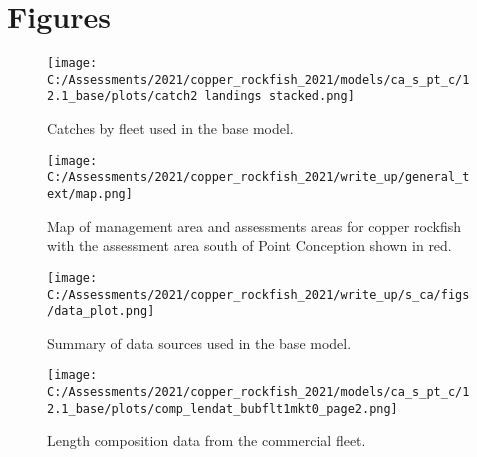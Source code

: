\documentclass[11pt,
  english,
  a4paper,
]{article}
\begin{document}
\newpage

\clearpage


\hypertarget{figures}{%
\section{Figures}\label{figures}}

\leavevmode\tagmcend\tagstructend


\begin{figure}
\centering
\texttt{[image: C:/Assessments/2021/copper\_rockfish\_2021/models/ca\_s\_pt\_c/12.1\_base/plots/catch2 landings stacked.png]}
\caption{Catches by fleet used in the base model.\label{fig:catch}}
\end{figure}

\tagmcend\tagstructend


\begin{figure}
\centering
\texttt{[image: C:/Assessments/2021/copper\_rockfish\_2021/write\_up/general\_text/map.png]}
\caption{Map of management area and assessments areas for copper rockfish with the assessment area south of Point Conception shown in red.\label{fig:map}}
\end{figure}

\tagmcend\tagstructend


\begin{figure}
\centering
\texttt{[image: C:/Assessments/2021/copper\_rockfish\_2021/write\_up/s\_ca/figs/data\_plot.png]}
\caption{Summary of data sources used in the base model.\label{fig:data-plot}}
\end{figure}

\tagmcend\tagstructend


\begin{figure}
\centering
\texttt{[image: C:/Assessments/2021/copper\_rockfish\_2021/models/ca\_s\_pt\_c/12.1\_base/plots/comp\_lendat\_bubflt1mkt0\_page2.png]}
\caption{Length composition data from the commercial fleet.\label{fig:com-len-data}}
\end{figure}
\end{document}
